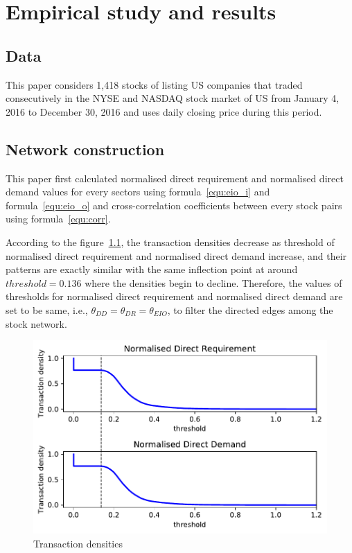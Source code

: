 \chapter[Short Chap title]{Empirical study and results}
\section{Data}
This paper considers 1,418 stocks of listing US companies that traded consecutively in the NYSE and NASDAQ stock market of US from January 4, 2016 to December 30, 2016 and uses daily closing price during this period.

\section{Network construction}
This paper first calculated normalised direct requirement and normalised direct demand values for every sectors using formula~\ref{equ:eio_i} and formula~\ref{equ:eio_o} and cross-correlation coefficients between every stock pairs using formula~\ref{equ:corr}.

According to the figure~\ref{fig:eio_transaction_density}, the transaction densities decrease as threshold of normalised direct requirement and normalised direct demand increase, and their patterns are exactly similar with the same inflection point at around $threshold=0.136$ where the densities begin to decline. Therefore, the values of thresholds for normalised direct requirement and normalised direct demand are set to be same, i.e., $\theta_{DD}=\theta_{DR}=\theta_{EIO}$,  to filter the directed edges among the stock network.

\begin{figure}
	\begin{center}
		\includegraphics[width=14cm]{eio_transaction_density}
	\end{center}
	\caption{Transaction densities}
	\label{fig:eio_transaction_density}
\end{figure}

